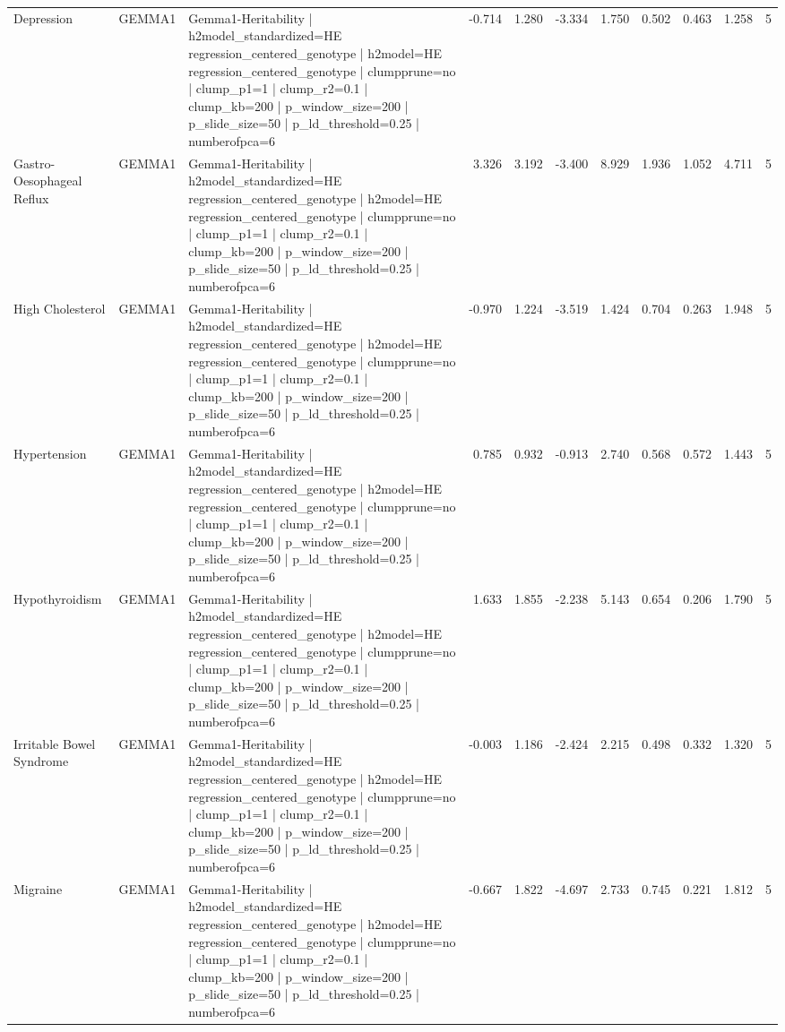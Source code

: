\begin{landscape}
\begin{longtable}{p{2.4cm}p{1.8cm}p{6.0cm}rrrrrrrr}
Depression & GEMMA1 & Gemma1-Heritability | h2model\_standardized=HE regression\_centered\_genotype | h2model=HE regression\_centered\_genotype | clumpprune=no | clump\_p1=1 | clump\_r2=0.1 | clump\_kb=200 | p\_window\_size=200 | p\_slide\_size=50 | p\_ld\_threshold=0.25 | numberofpca=6 & -0.714 & 1.280 & -3.334 & 1.750 & 0.502 & 0.463 & 1.258 & 5 \\
Gastro-Oesophageal Reflux & GEMMA1 & Gemma1-Heritability | h2model\_standardized=HE regression\_centered\_genotype | h2model=HE regression\_centered\_genotype | clumpprune=no | clump\_p1=1 | clump\_r2=0.1 | clump\_kb=200 | p\_window\_size=200 | p\_slide\_size=50 | p\_ld\_threshold=0.25 | numberofpca=6 & 3.326 & 3.192 & -3.400 & 8.929 & 1.936 & 1.052 & 4.711 & 5 \\
High Cholesterol & GEMMA1 & Gemma1-Heritability | h2model\_standardized=HE regression\_centered\_genotype | h2model=HE regression\_centered\_genotype | clumpprune=no | clump\_p1=1 | clump\_r2=0.1 | clump\_kb=200 | p\_window\_size=200 | p\_slide\_size=50 | p\_ld\_threshold=0.25 | numberofpca=6 & -0.970 & 1.224 & -3.519 & 1.424 & 0.704 & 0.263 & 1.948 & 5 \\
Hypertension & GEMMA1 & Gemma1-Heritability | h2model\_standardized=HE regression\_centered\_genotype | h2model=HE regression\_centered\_genotype | clumpprune=no | clump\_p1=1 | clump\_r2=0.1 | clump\_kb=200 | p\_window\_size=200 | p\_slide\_size=50 | p\_ld\_threshold=0.25 | numberofpca=6 & 0.785 & 0.932 & -0.913 & 2.740 & 0.568 & 0.572 & 1.443 & 5 \\
Hypothyroidism & GEMMA1 & Gemma1-Heritability | h2model\_standardized=HE regression\_centered\_genotype | h2model=HE regression\_centered\_genotype | clumpprune=no | clump\_p1=1 | clump\_r2=0.1 | clump\_kb=200 | p\_window\_size=200 | p\_slide\_size=50 | p\_ld\_threshold=0.25 | numberofpca=6 & 1.633 & 1.855 & -2.238 & 5.143 & 0.654 & 0.206 & 1.790 & 5 \\
Irritable Bowel Syndrome & GEMMA1 & Gemma1-Heritability | h2model\_standardized=HE regression\_centered\_genotype | h2model=HE regression\_centered\_genotype | clumpprune=no | clump\_p1=1 | clump\_r2=0.1 | clump\_kb=200 | p\_window\_size=200 | p\_slide\_size=50 | p\_ld\_threshold=0.25 | numberofpca=6 & -0.003 & 1.186 & -2.424 & 2.215 & 0.498 & 0.332 & 1.320 & 5 \\
Migraine & GEMMA1 & Gemma1-Heritability | h2model\_standardized=HE regression\_centered\_genotype | h2model=HE regression\_centered\_genotype | clumpprune=no | clump\_p1=1 | clump\_r2=0.1 | clump\_kb=200 | p\_window\_size=200 | p\_slide\_size=50 | p\_ld\_threshold=0.25 | numberofpca=6 & -0.667 & 1.822 & -4.697 & 2.733 & 0.745 & 0.221 & 1.812 & 5 \\

\end{longtable}
\end{landscape}
